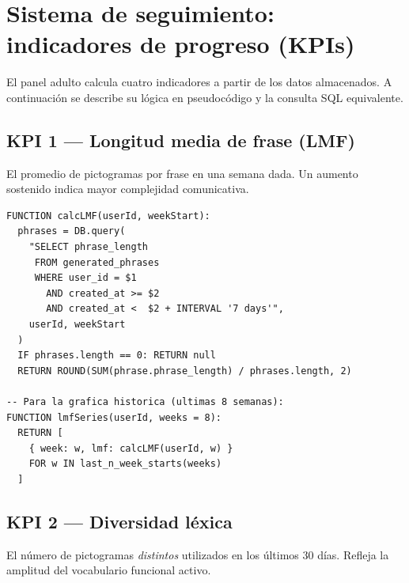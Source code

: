 \documentclass[12pt, a4paper]{article}
\begin{document}
\section{Sistema de seguimiento: indicadores de progreso (KPIs)}

El panel adulto calcula cuatro indicadores a partir de los datos almacenados. A continuación se describe su lógica en pseudocódigo y la consulta SQL equivalente.

\subsection{KPI 1 --- Longitud media de frase (LMF)}

\begin{puntoclave}
El promedio de pictogramas por frase en una semana dada. Un aumento sostenido indica mayor complejidad comunicativa.
\end{puntoclave}

\begin{cajatecnica}
\begin{lstlisting}
FUNCTION calcLMF(userId, weekStart):
  phrases = DB.query(
    "SELECT phrase_length
     FROM generated_phrases
     WHERE user_id = $1
       AND created_at >= $2
       AND created_at <  $2 + INTERVAL '7 days'",
    userId, weekStart
  )
  IF phrases.length == 0: RETURN null
  RETURN ROUND(SUM(phrase.phrase_length) / phrases.length, 2)

-- Para la grafica historica (ultimas 8 semanas):
FUNCTION lmfSeries(userId, weeks = 8):
  RETURN [
    { week: w, lmf: calcLMF(userId, w) }
    FOR w IN last_n_week_starts(weeks)
  ]
\end{lstlisting}
\end{cajatecnica}

\subsection{KPI 2 --- Diversidad léxica}

\begin{puntoclave}
El número de pictogramas \emph{distintos} utilizados en los últimos 30 días. Refleja la amplitud del vocabulario funcional activo.
\end{puntoclave}
\end{document}
